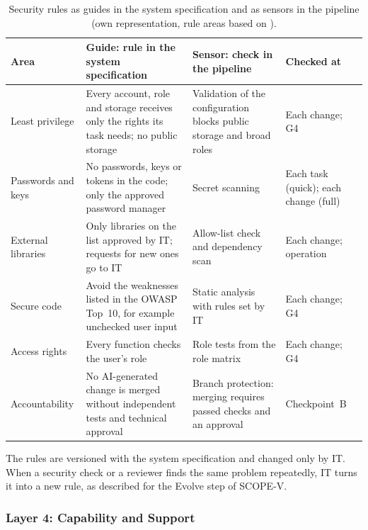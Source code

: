 \documentclass[10pt,a4paper]{article}
\begin{document}
\begin{table}[H]
    \centering
    \small
    \caption{Security rules as guides in the system specification and as
    sensors in the pipeline (own representation, rule areas based on
    \textcite{TODO-koul2026vibesec}).}
    \label{tab:security-rules}
    \begin{tabular}{p{2.6cm} p{4.6cm} p{4.6cm} p{2.0cm}}
    \hline
    \textbf{Area} & \textbf{Guide: rule in the system specification} &
        \textbf{Sensor: check in the pipeline} & \textbf{Checked at} \\
    \hline
    Least privilege & Every account, role and storage receives only the
        rights its task needs; no public storage & Validation of the
        configuration blocks public storage and broad roles & Each change;
        G4 \\
    Passwords and keys & No passwords, keys or tokens in the code; only
        the approved password manager & Secret scanning & Each task
        (quick); each change (full) \\
    External libraries & Only libraries on the list approved by IT;
        requests for new ones go to IT & Allow-list check and dependency
        scan & Each change; operation \\
    Secure code & Avoid the weaknesses listed in the OWASP Top~10, for
        example unchecked user input & Static analysis with rules set by
        IT & Each change; G4 \\
    Access rights & Every function checks the user's role & Role tests
        from the role matrix & Each change; G4 \\
    Accountability & No AI-generated change is merged without independent
        tests and technical approval & Branch protection: merging requires
        passed checks and an approval & Checkpoint~B \\
    \hline
    \end{tabular}
\end{table}
 
The rules are versioned with the system specification and changed only by
IT. When a security check or a reviewer finds the same problem repeatedly,
IT turns it into a new rule, as described for the Evolve step of SCOPE-V.

\subsubsection{Layer 4: Capability and Support}
\label{sec:layer4}
\end{document}
